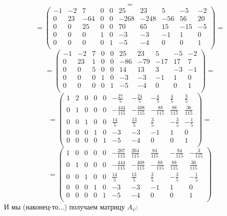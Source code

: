 \documentclass[a4paper,12pt]{article}
\begin{document}
\[
=
\]
\[
=
\begin{pmatrix}
-1 & -2 & 7 & 0 & 0 & 25 & 23 & 5 & -5 & -2 \\
0 & 23 & -64 & 0 & 0 & -268 & -248 & -56 & 56 & 20  \\
0 & 0 & 25 & 0 & 0 & 70 & 65 & 15 & -15 & -5  \\
0 & 0 & 0 & 1 & 0 & -3 & -3 & -1 & 1 & 0 \\
0 & 0 & 0 & 0 & 1 & -5 & -4 & 0 & 0 & 1 \\
\end{pmatrix}
=
\]
\[
=
\begin{pmatrix}
-1 & -2 & 7 & 0 & 0 & 25 & 23 & 5 & -5 & -2 \\
0 & 23 & 1 & 0 & 0 & -86 & -79 & -17 & 17 & 7 \\
0 & 0 & 5 & 0 & 0 & 14 & 13 & 3 & -3 & -1 \\
0 & 0 & 0 & 1 & 0 & -3 & -3 & -1 & 1 & 0 \\
0 & 0 & 0 & 0 & 1 & -5 & -4 & 0 & 0 & 1 \\
\end{pmatrix}
=
\]
\[
=
\begin{pmatrix}
1 & 2 & 0 & 0 & 0 & -\frac{27}{5} & -\frac{24}{5}& -\frac{4}{5} & \frac{4}{5} & \frac{3}{5}\\
0 & 1& 0 & 0 & 0 & -\frac{444}{115 } & -\frac{408}{115} & -\frac{88}{115} & \frac{88}{115} & \frac{36}{115} \\
0 & 0 & 1 & 0 & 0 & \frac{14}{5} & \frac{13}{5} & \frac{3}{5} & -\frac{3}{5} & -\frac{1}{5} \\
0 & 0 & 0 & 1 & 0 & -3 & -3 & -1 & 1 & 0 \\
0 & 0 & 0 & 0 & 1 & -5 & -4 & 0 & 0 & 1 \\
\end{pmatrix} =
\]
\[
=
\begin{pmatrix}
1 & 0& 0 & 0 & 0 & -\frac{267}{115} & \frac{264}{115}& \frac{84}{115} & -\frac{84}{115} & -\frac{3}{115}\\
0 & 1& 0 & 0 & 0 & -\frac{444}{115 } & -\frac{408}{115} & -\frac{88}{115} & \frac{88}{115} & \frac{36}{115} \\
0 & 0 & 1 & 0 & 0 & \frac{14}{5} & \frac{13}{5} & \frac{3}{5} & -\frac{3}{5} & -\frac{1}{5} \\
0 & 0 & 0 & 1 & 0 & -3 & -3 & -1 & 1 & 0 \\
0 & 0 & 0 & 0 & 1 & -5 & -4 & 0 & 0 & 1 \\
\end{pmatrix}
\]
И мы (наконец-то...) получаем матрицу $A_{\psi}$:
\end{document}
